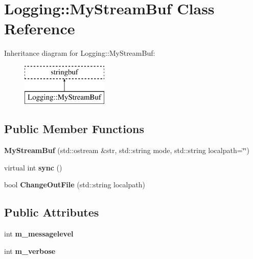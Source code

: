 \hypertarget{classLogging_1_1MyStreamBuf}{\section{Logging\-:\-:My\-Stream\-Buf Class Reference}
\label{classLogging_1_1MyStreamBuf}
}
Inheritance diagram for Logging\-:\-:My\-Stream\-Buf\-:\begin{figure}[H]
\begin{center}
\leavevmode
\includegraphics[height=2.000000cm]{classLogging_1_1MyStreamBuf}
\end{center}
\end{figure}
\subsection*{Public Member Functions}
\begin{DoxyCompactItemize}
\item 
\hypertarget{classLogging_1_1MyStreamBuf_a05b8632ac8a69efc34144266fdef3441}{{\bfseries My\-Stream\-Buf} (std\-::ostream \&str, std\-::string mode, std\-::string localpath=\char`\"{}\char`\"{})}\label{classLogging_1_1MyStreamBuf_a05b8632ac8a69efc34144266fdef3441}

\item 
\hypertarget{classLogging_1_1MyStreamBuf_ae06a0c7f0f8c72ceb342630a819457cd}{virtual int {\bfseries sync} ()}\label{classLogging_1_1MyStreamBuf_ae06a0c7f0f8c72ceb342630a819457cd}

\item 
\hypertarget{classLogging_1_1MyStreamBuf_a400c762f73da994dd496b7234a0953fd}{bool {\bfseries Change\-Out\-File} (std\-::string localpath)}\label{classLogging_1_1MyStreamBuf_a400c762f73da994dd496b7234a0953fd}

\end{DoxyCompactItemize}
\subsection*{Public Attributes}
\begin{DoxyCompactItemize}
\item 
\hypertarget{classLogging_1_1MyStreamBuf_aadb5677582e31b1c7994c2cfa355edba}{int {\bfseries m\-\_\-messagelevel}}\label{classLogging_1_1MyStreamBuf_aadb5677582e31b1c7994c2cfa355edba}

\item 
\hypertarget{classLogging_1_1MyStreamBuf_afa47f8ca7e37b4408fdab52912e29c77}{int {\bfseries m\-\_\-verbose}}\label{classLogging_1_1MyStreamBuf_afa47f8ca7e37b4408fdab52912e29c77}

\end{DoxyCompactItemize}
